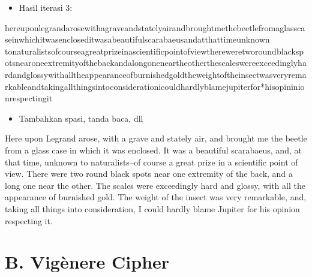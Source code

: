 \documentclass{article}
\begin{document}
\newpage


\begin{itemize}
  \item Hasil iterasi 3:
\end{itemize}

\noindent hereuponlegrandarosewithagraveandstatelyairandbr\newline oughtmethebeetlefromaglasscaseinwhichitwasenclos\newline editwasabeautifulscarabaeusandatthattimeunknown t\newline onaturalistsofcourseagreatprizeinascientificpoin\newline tofviewthereweretworoundblackspotsnearoneextremi\newline tyofthebackandalongoneneartheotherthescalesweree\newline xceedinglyhardandglossywithalltheappearanceofbur\newline nishedgoldtheweightoftheinsectwasveryremarkablea\newline ndtakingallthingsintoconsiderationicouldhardlybl\newline amejupiterfor*hisopininionrespectingit

\newpage


\begin{itemize}
  \item Tambahkan spasi, tanda baca, dll
\end{itemize}

Here upon Legrand arose, with a grave and stately air, and brought me the beetle from a glass case in which it was enclosed. It was a beautiful scarabaeus, and, at that time, unknown to naturalists--of course a great prize in a scientific point of view. There were two round black spots near one extremity of the back, and a long one near the other. The scales were exceedingly hard and glossy, with all the appearance of burnished gold. The weight of the insect was very remarkable, and, taking all things into consideration, I could hardly blame Jupiter for his opinion respecting it.

\newpage


\section*{B. Vig\`enere Cipher}
\end{document}

